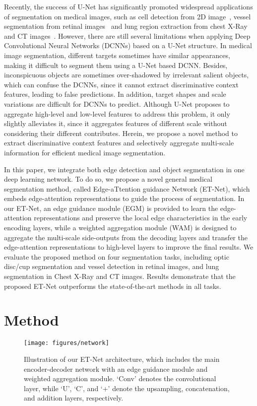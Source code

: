 \documentclass[runningheads,a4paper]{llncs}
\begin{document}
Recently, the success of U-Net has significantly promoted widespread applications of segmentation on medical images, such as cell detection from 2D image~\cite{Ronneberger2015}, vessel segmentation from retinal images~\cite{deepvessel2016} and lung region extraction from chest X-Ray and CT images~\cite{lung2015}. However, there are still several limitations when applying Deep Convolutional Neural Networks (DCNNs) based on a U-Net structure. In medical image segmentation, different targets sometimes have similar appearances, making it difficult to segment them using a U-Net based DCNN. Besides, inconspicuous objects are sometimes over-shadowed by irrelevant salient objects, which can confuse the DCNNs, since it cannot extract discriminative context features, leading to false predictions. In addition, target shapes and scale variations are difficult for DCNNs to predict. Although U-Net proposes to aggregate high-level and low-level features to address this problem, it only slightly alleviates it, since it aggregates features of different scale without considering their different contributes. Herein, we propose a novel method to extract discriminative context features and selectively aggregate multi-scale information for efficient medical image segmentation.

In this paper, we integrate both edge detection and object segmentation in one deep learning network. To do so, we propose a novel general medical segmentation method, called Edge-aTtention guidance Network (ET-Net), which embeds edge-attention representations to guide the process of segmentation.
In our ET-Net, an edge guidance module (EGM) is provided to learn the edge-attention representations and preserve the local edge characteristics in the early encoding layers, while a weighted aggregation module (WAM) is designed to aggregate the multi-scale side-outputs from the decoding layers and transfer the edge-attention representations to high-level layers to improve the final results. We evaluate the proposed method on four segmentation tasks, including optic disc/cup segmentation and vessel detection in retinal images, and lung segmentation in Chest X-Ray and CT images. Results demonstrate that the proposed ET-Net outperforms the state-of-the-art methods in all tasks.


\section{Method}
\label{sec:method}

\begin{figure}[!t]
	\centering
	\texttt{[image: figures/network]}
	\caption{Illustration of our ET-Net architecture, which includes the main encoder-decoder network with an edge guidance module and weighted aggregation module. `Conv'  denotes the convolutional layer, while `U', `C', and `+' denote the upsampling, concatenation, and addition layers, respectively.}
	\label{fig_network}
\end{figure}
\end{document}
